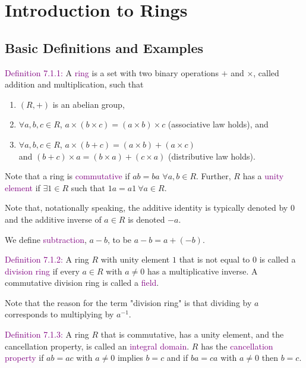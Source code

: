 \documentclass{article}
\begin{document}
\newpage
\setcounter{section}{6}
\section{Introduction to Rings}
\subsection{Basic Definitions and Examples}

\textcolor{purple}{Definition 7.1.1:} A \textcolor{purple}{ring} is a set with two binary operations $+$ and $\times$, called addition and 
multiplication, such that
\begin{enumerate}
    \item $(R,+)$ is an abelian group,
    \item $\forall a,b,c \in R$, $a \times (b \times c) = (a \times b) \times c$ (associative law holds), and
    \item $\forall a,b,c \in R$, $a \times (b + c) = (a \times b) + (a \times c)$ \\
    and $(b + c) \times a = (b \times a) + (c \times a)$ (distributive law holds).
\end{enumerate}

Note that a ring is \textcolor{purple}{commutative} if $ab = ba$ $\forall a,b \in R$. Further, $R$ has a \textcolor{purple}{unity element} 
if $\exists 1 \in R$ such that $1a = a1 \ \forall a \in R$.

Note that, notationally speaking, the additive identity is typically denoted by $0$ and the additive inverse of $a \in R$ is denoted $-a$.

We define \textcolor{purple}{subtraction}, $a - b$, to be $a - b = a+(-b)$.

\textcolor{purple}{Definition 7.1.2:} A ring $R$ with unity element $1$ that is not equal to $0$ is called a \textcolor{purple}{division 
ring} if every $a \in R$ with $a \neq 0$ has a multiplicative inverse. A commutative division ring is called a \textcolor{purple}{field}.

Note that the reason for the term "division ring" is that dividing by $a$ corresponds to multiplying by $a^{-1}$.

\textcolor{purple}{Definition 7.1.3:} A ring $R$ that is commutative, has a unity element, and the cancellation property, is called an 
\textcolor{purple}{integral domain}. $R$ has the \textcolor{purple}{cancellation property} if $ab = ac$ with $a \neq 0$ implies $b = c$ 
and if $ba = ca$ with $a \neq 0$ then $b = c$.
\end{document}
